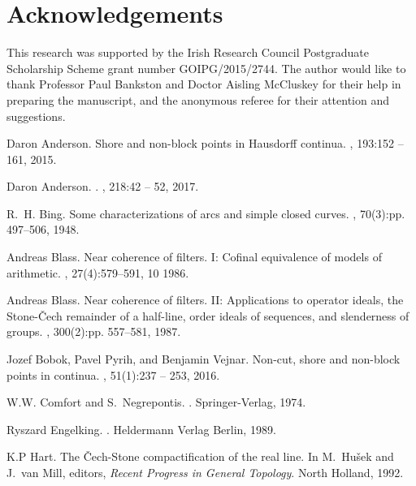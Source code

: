 \documentclass[12pt]{article}
\theoremstyle{plain}
\theoremstyle{definition}
\newcommand{\0}{\ensuremath{\varnothing}}
\begin{document}
\section*{Acknowledgements}
This research was supported by the Irish Research Council Postgraduate Scholarship Scheme grant number GOIPG/2015/2744. 
The author would like to thank Professor Paul Bankston and Doctor Aisling McCluskey for their help in preparing the manuscript, and the anonymous referee for their attention and suggestions.
\begin{thebibliography}{10}
	
	Daron Anderson.
	\newblock Shore and non-block points in {H}ausdorff continua.
	, 193:152 -- 161, 2015.
	
	Daron Anderson.
	.
	, 218:42 -- 52, 2017.
	
	R.~H. Bing.
	\newblock Some characterizations of arcs and simple closed curves.
	, 70(3):pp. 497--506, 1948.
	
	Andreas Blass.
	\newblock Near coherence of filters. {I}: Cofinal equivalence of models of
	arithmetic.
	, 27(4):579--591, 10 1986.
	
	Andreas Blass.
	\newblock Near coherence of filters. {II}: Applications to operator ideals, the
	{S}tone-\v{C}ech remainder of a half-line, order ideals of sequences, and
	slenderness of groups.
	, 300(2):pp.
	557--581, 1987.
	
	Jozef Bobok, Pavel Pyrih, and Benjamin Vejnar.
	\newblock Non-cut, shore and non-block points in continua.
	, 51(1):237 -- 253, 2016.
	
	W.W. Comfort and S.~Negrepontis.
	.
	\newblock Springer-Verlag, 1974.
	
	Ryszard Engelking.
	.
	\newblock Heldermann Verlag Berlin, 1989.
	
	K.P Hart.
	\newblock The \v{C}ech-{S}tone compactification of the real line.
	\newblock In M.~Hu{\v{s}}ek and J.~van Mill, editors, {\em Recent Progress in
		General Topology}. North Holland, 1992.
	

\end{thebibliography}
\end{document}

